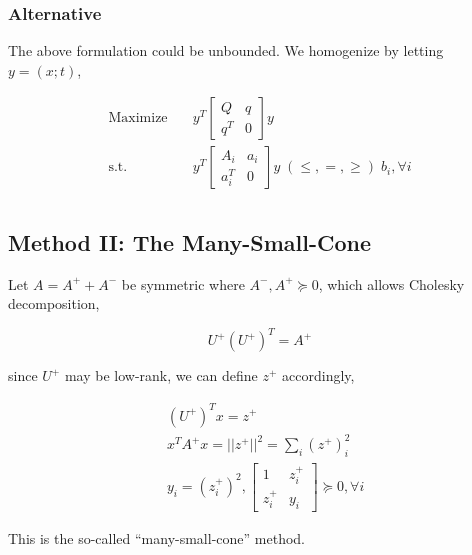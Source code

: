 \documentclass[../main]{subfiles}
\begin{document}
\subsubsection*{Alternative}
The above formulation could be unbounded. We homogenize by letting \(y = (x; t)\),

\begin{equation}
  \begin{aligned}
    \mathrm{Maximize}\quad & y^T
    \begin{bmatrix} Q   & q \\ q^T & 0 \end{bmatrix}y                                                                   \\
    \mathrm{s.t.} \quad    & y^T  \begin{bmatrix} A_i   & a_i \\ a_i^T & 0 \end{bmatrix}y  \; (\le, =, \ge) \; b_i, \forall i \\
  \end{aligned}
\end{equation}



\subsection{Method II: The Many-Small-Cone}\label{sdp-method-2}
Let \(A = A^+ + A^-\) be symmetric where \(A^-, A^+ \succeq 0\), which allows Cholesky decomposition,

\[U^+ (U^+)^T = A^+\]

since $U^+$ may be low-rank, we can define $z^+$ accordingly,

\begin{equation}
  \begin{aligned}
     & (U^+)^T x = z^+                                                  \\
     & x^TA^+ x = ||z^+||^2 = \sum_i (z^+)_i^2                          \\
     & y_i = (z^+_i)^2, \begin{bmatrix} 1 & z^+_i \\ z^+_i & y_i \end{bmatrix} \succeq 0, \forall i
  \end{aligned}
\end{equation}

This is the so-called ``many-small-cone'' method.
\end{document}
